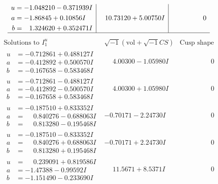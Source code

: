 \documentclass[1p]{elsarticle_modified}
\theoremstyle{definition}
\newcommand{\I}{\sqrt{-1}}
\begin{document}
$$\begin{array}{c|c|c}
\begin{aligned}
u &= -1.048210 - 0.371939 I \\
a &= -1.86845 + 0.10856 I \\
b &= \phantom{-}1.324620 + 0.352471 I\end{aligned}
 & \phantom{-}10.73120 + 5.00750 I & \phantom{-0.000000 } 0\\
 \hline 
 \end{array}$$\newpage$$\begin{array}{c|c|c}  
\text{Solutions to }I^u_{1}& \I (\text{vol} + \sqrt{-1}CS) & \text{Cusp shape}\\
 \hline 
\begin{aligned}
u &= -0.712861 + 0.488127 I \\
a &= -0.412892 + 0.500570 I \\
b &= -0.167658 - 0.583468 I\end{aligned}
 & \phantom{-}4.00300 - 1.05980 I & \phantom{-0.000000 } 0 \\ \hline\begin{aligned}
u &= -0.712861 - 0.488127 I \\
a &= -0.412892 - 0.500570 I \\
b &= -0.167658 + 0.583468 I\end{aligned}
 & \phantom{-}4.00300 + 1.05980 I & \phantom{-0.000000 } 0 \\ \hline\begin{aligned}
u &= -0.187510 + 0.833352 I \\
a &= \phantom{-}0.840276 - 0.688063 I \\
b &= \phantom{-}0.813280 - 0.195468 I\end{aligned}
 & -0.70171 - 2.24730 I & \phantom{-0.000000 } 0 \\ \hline\begin{aligned}
u &= -0.187510 - 0.833352 I \\
a &= \phantom{-}0.840276 + 0.688063 I \\
b &= \phantom{-}0.813280 + 0.195468 I\end{aligned}
 & -0.70171 + 2.24730 I & \phantom{-0.000000 } 0 \\ \hline\begin{aligned}
u &= \phantom{-}0.239091 + 0.819586 I \\
a &= -1.47388 - 0.99592 I \\
b &= -1.151490 - 0.233690 I\end{aligned}
 & \phantom{-}11.5671 + 8.5371 I & \phantom{-0.000000 } 0 \\ \hline\begin{aligned}

\end{aligned}
\end{array}$$
\end{document}
